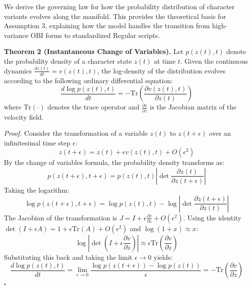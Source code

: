 \documentclass{article}
\begin{document}
We derive the governing law for how the probability distribution of character variants evolves along the manifold. This provides the theoretical basis for Assumption 3, explaining how the model handles the transition from high-variance OBI forms to standardized Regular scripts.

\textbf{Theorem 2 (Instantaneous Change of Variables).} 
Let $p(z(t), t)$ denote the probability density of a character state $z(t)$ at time $t$. Given the continuous dynamics $\frac{d z(t)}{d t} = v(z(t), t)$, the log-density of the distribution evolves according to the following ordinary differential equation:
\begin{equation}
    \frac{d \log p(z(t), t)}{d t} = - \text{Tr}\left(\frac{\partial v(z(t), t)}{\partial z(t)}\right)
\end{equation}
where $\text{Tr}(\cdot)$ denotes the trace operator and $\frac{\partial v}{\partial z}$ is the Jacobian matrix of the velocity field.

\textit{Proof.} 
Consider the transformation of a variable $z(t)$ to $z(t+\epsilon)$ over an infinitesimal time step $\epsilon$:
\begin{equation}
    z(t+\epsilon) = z(t) + \epsilon v(z(t), t) + O(\epsilon^2)
\end{equation}
By the change of variables formula, the probability density transforms as:
\begin{equation}
    p(z(t+\epsilon), t+\epsilon) = p(z(t), t) \left| \det \frac{\partial z(t)}{\partial z(t+\epsilon)} \right|
\end{equation}
Taking the logarithm:
\begin{equation}
    \log p(z(t+\epsilon), t+\epsilon) = \log p(z(t), t) - \log \left| \det \frac{\partial z(t+\epsilon)}{\partial z(t)} \right|
\end{equation}
The Jacobian of the transformation is $J = I + \epsilon \frac{\partial v}{\partial z} + O(\epsilon^2)$. Using the identity $\det(I + \epsilon A) = 1 + \epsilon \text{Tr}(A) + O(\epsilon^2)$ and $\log(1+x) \approx x$:
\begin{equation}
    \log \left| \det \left(I + \epsilon \frac{\partial v}{\partial z}\right) \right| \approx \epsilon \text{Tr}\left(\frac{\partial v}{\partial z}\right)
\end{equation}
Substituting this back and taking the limit $\epsilon \to 0$ yields:
\begin{equation}
    \frac{d \log p(z(t), t)}{d t} = \lim_{\epsilon \to 0} \frac{\log p(z(t+\epsilon)) - \log p(z(t))}{\epsilon} = - \text{Tr}\left(\frac{\partial v}{\partial z}\right)
\end{equation}
\hfill $\square$
\end{document}
